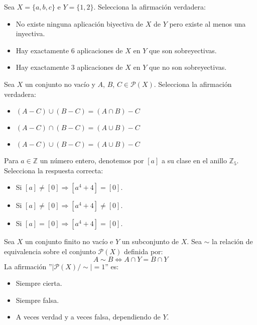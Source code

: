 \documentclass[12pt]{article}
\newcounter{ejercicio}[section] %
\newcounter{ejercicio}
\begin{document}
    \begin{ejercicio}
        Sea $X = \{a, b, c\}$ e $Y = \{1, 2\}$. Selecciona la afirmación verdadera:
        \begin{itemize}
            \item No existe ninguna aplicación biyectiva de $X$ de $Y$ pero existe al menos una inyectiva.
            \item Hay exactamente 6 aplicaciones de $X$ en $Y$ que son sobreyectivas.
            \item Hay exactamente 3 aplicaciones de $X$ en $Y$ que no son sobreyectivas.
        \end{itemize}
    \end{ejercicio}

    \begin{ejercicio}
        Sea $X$ un conjunto no vacío y $A$, $B$, $C \in \mathcal{P}(X)$. Selecciona la afirmación verdadera:
        \begin{itemize}
            \item $(A-C) \cup (B-C) = (A\cap B)-C$
            \item $(A-C) \cap (B-C) = (A\cup B)-C$
            \item $(A-C) \cup (B-C) = (A\cup B)-C$
        \end{itemize}
    \end{ejercicio}

    \begin{ejercicio}
        Para $a \in \mathbb{Z}$ un número entero, denotemos por $[a]$ a su clase en el anillo $\mathbb{Z}_5$. Selecciona la respuesta correcta:
        \begin{itemize}
            \item Si $[a] \neq [0] \Rightarrow [a^4+4] = [0]$.
            \item Si $[a] \neq [0] \Rightarrow [a^4+4] \neq [0]$.
            \item Si $[a] = [0] \Rightarrow [a^4+4] = [0]$.
        \end{itemize}
    \end{ejercicio}

    \begin{ejercicio}
        Sea $X$ un conjunto finito no vacío e $Y$ un subconjunto de $X$. Sea $\sim$ la relación de equivalencia sobre el conjunto $\mathcal{P}(X)$ definida por:
        $$A \sim B \Leftrightarrow A \cap Y = B \cap Y$$
        La afirmación ''$|\mathcal{P}(X)/\sim|=1$'' es:
        \begin{itemize}
            \item Siempre cierta.
            \item Siempre falsa.
            \item A veces verdad y a veces falsa, dependiendo de $Y$.
        \end{itemize}
    \end{ejercicio}
\end{document}
